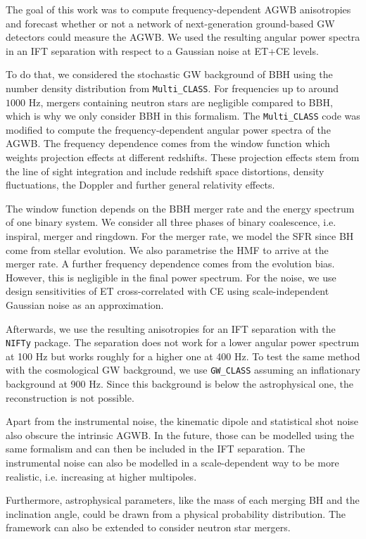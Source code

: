 The goal of this work was to compute frequency-dependent AGWB anisotropies and forecast whether or not a network of next-generation ground-based GW detectors could measure the AGWB. We used the resulting angular power spectra in an IFT separation with respect to a Gaussian noise at ET+CE levels.

To do that, we considered the stochastic GW background of BBH using the number density distribution from {\tt Multi\_CLASS}. For frequencies up to around $ 1000$ Hz, mergers containing neutron stars are negligible compared to BBH, which is why we only consider BBH in this formalism.
The {\tt Multi\_CLASS} code was modified to compute the frequency-dependent angular power spectra of the AGWB. The frequency dependence comes from the window function which weights projection effects at different redshifts. These projection effects stem from the line of sight integration and include redshift space distortions, density fluctuations, the Doppler and further general relativity effects. 

The window function depends on the BBH merger rate and the energy spectrum of one binary system. We consider all three phases of binary coalescence, i.e. inspiral, merger and ringdown. For the merger rate, we model the SFR since BH come from stellar evolution. We also parametrise the HMF to arrive at the merger rate. A further frequency dependence comes from the evolution bias. However, this is negligible in the final power spectrum. For the noise, we use design sensitivities of ET cross-correlated with CE using scale-independent Gaussian noise as an approximation.

Afterwards, we use the resulting anisotropies for an IFT separation with the {\tt NIFTy} package. The separation does not work for a lower angular power spectrum at 100 Hz but works roughly for a higher one at 400 Hz.
To test the same method with the cosmological GW background, we use {\tt GW\_CLASS} assuming an inflationary background at 900 Hz. Since this background is below the astrophysical one, the reconstruction is not possible.

Apart from the instrumental noise, the kinematic dipole and statistical shot noise also obscure the intrinsic AGWB. In the future, those can be modelled using the same formalism and can then be included in the IFT separation. The instrumental noise can also be modelled in a scale-dependent way to be more realistic, i.e. increasing at higher multipoles. 

Furthermore, astrophysical parameters, like the mass of each merging BH and the inclination angle, could be drawn from a physical probability distribution. The framework can also be extended to consider neutron star mergers.

